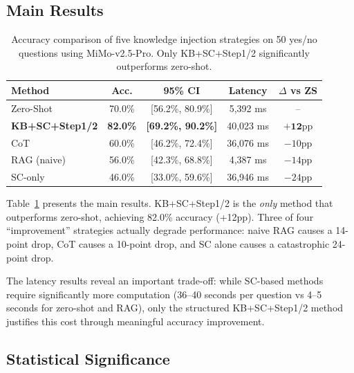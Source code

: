 \subsection{Main Results}

\begin{table}[htbp]
\centering
\caption{Accuracy comparison of five knowledge injection strategies on 50 yes/no questions using MiMo-v2.5-Pro. Only KB+SC+Step1/2 significantly outperforms zero-shot.}
\label{tab:results}
\begin{tabular}{lcccc}
\toprule
\textbf{Method} & \textbf{Acc.} & \textbf{95\% CI} & \textbf{Latency} & \textbf{$\Delta$ vs ZS} \\
\midrule
Zero-Shot & 70.0\% & [56.2\%, 80.9\%] & 5,392 ms & -- \\
\textbf{KB+SC+Step1/2} & \textbf{82.0\%} & \textbf{[69.2\%, 90.2\%]} & 40,023 ms & $\mathbf{+12}$pp \\
CoT & 60.0\% & [46.2\%, 72.4\%] & 36,076 ms & $-10$pp \\
RAG (naive) & 56.0\% & [42.3\%, 68.8\%] & 4,387 ms & $-14$pp \\
SC-only & 46.0\% & [33.0\%, 59.6\%] & 36,946 ms & $-24$pp \\
\bottomrule
\end{tabular}
\end{table}

Table~\ref{tab:results} presents the main results. KB+SC+Step1/2 is the \emph{only} method that outperforms zero-shot, achieving 82.0\% accuracy (+12pp). Three of four ``improvement'' strategies actually degrade performance: naive RAG causes a 14-point drop, CoT causes a 10-point drop, and SC alone causes a catastrophic 24-point drop.

The latency results reveal an important trade-off: while SC-based methods require significantly more computation (36--40 seconds per question vs 4--5 seconds for zero-shot and RAG), only the structured KB+SC+Step1/2 method justifies this cost through meaningful accuracy improvement.

\subsection{Statistical Significance}

